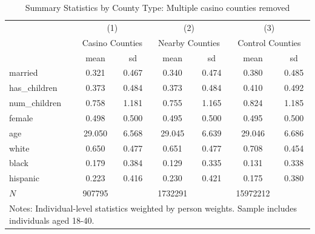 \begin{table}[htbp]\centering
\def\sym#1{\ifmmode^{#1}\else\(^{#1}\)\fi}
\caption{Summary Statistics by County Type: Multiple casino counties removed}
\begin{tabular}{l*{3}{cc}}
\hline\hline
            &\multicolumn{2}{c}{(1)}  &\multicolumn{2}{c}{(2)}  &\multicolumn{2}{c}{(3)}  \\
            &\multicolumn{2}{c}{Casino Counties}&\multicolumn{2}{c}{Nearby Counties}&\multicolumn{2}{c}{Control Counties}\\
            &        mean&          sd&        mean&          sd&        mean&          sd\\
\hline
married     &       0.321&       0.467&       0.340&       0.474&       0.380&       0.485\\
has\_children&       0.373&       0.484&       0.373&       0.484&       0.410&       0.492\\
num\_children&       0.758&       1.181&       0.755&       1.165&       0.824&       1.185\\
female      &       0.498&       0.500&       0.495&       0.500&       0.495&       0.500\\
age         &      29.050&       6.568&      29.045&       6.639&      29.046&       6.686\\
white       &       0.650&       0.477&       0.651&       0.477&       0.708&       0.454\\
black       &       0.179&       0.384&       0.129&       0.335&       0.131&       0.338\\
hispanic    &       0.223&       0.416&       0.230&       0.421&       0.175&       0.380\\
\hline
\(N\)       &      907795&            &     1732291&            &    15972212&            \\
\hline\hline
\multicolumn{7}{l}{\footnotesize Notes: Individual-level statistics weighted by person weights. Sample includes individuals aged 18-40.}\\
\end{tabular}
\end{table}
